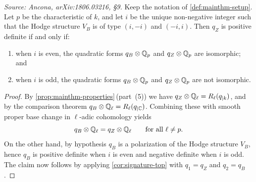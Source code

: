 \begin{proposition}
  \label{prop:padic-reduction}
  \textit{Source: Ancona, arXiv:1806.03216, §9.}
  Keep the notation of \cref{def:mainthm-setup}. Let \(p\) be the characteristic
  of \(k\), and let \(i\) be the unique non-negative integer such that the Hodge
  structure \(V_B\) is of type \((i,-i)\) and \((-i,i)\). Then \(q_Z\) is
  positive definite if and only if:
  \begin{enumerate}
    \item when \(i\) is even, the quadratic forms \(q_B \otimes \mathbb{Q}_p\) and
      \(q_Z \otimes \mathbb{Q}_p\) are isomorphic; and
    \item when \(i\) is odd, the quadratic forms \(q_B \otimes \mathbb{Q}_p\) and
      \(q_Z \otimes \mathbb{Q}_p\) are not isomorphic.
  \end{enumerate}
\end{proposition}

\begin{proof}
  By \cref{prop:mainthm-properties}\,(part~(5)) we
  have \(q_Z \otimes \mathbb{Q}_\ell = R_\ell(q_{\vert{k}})\), and by the comparison
  theorem \(q_B \otimes \mathbb{Q}_\ell = R_\ell(q_{\vert\mathbb{C}})\). Combining these with
  smooth proper base change in \(\ell\)-adic cohomology yields
  \[q_B \otimes \mathbb{Q}_\ell = q_Z \otimes \mathbb{Q}_\ell \qquad
    \text{for all } \ell \neq p.\]
  On the other hand, by hypothesis \(q_B\) is a polarization of the Hodge
  structure \(V_B\), hence \(q_B\) is positive definite when \(i\) is even and
  negative definite when \(i\) is odd. The claim now follows by applying
  \cref{cor:signature-top} with \(q_1 = q_Z\) and \(q_2 = q_B\).
\end{proof}
